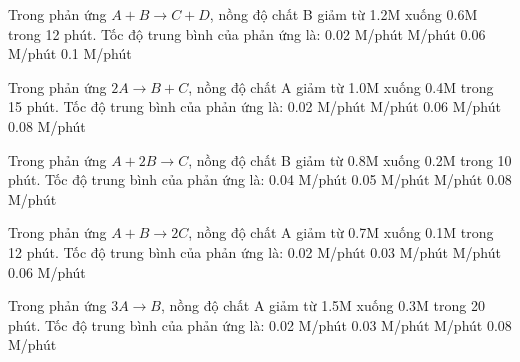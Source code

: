 \documentclass[Main.tex]{subfiles}
\begin{document}
    \begin{ex}
        Trong phản ứng $A + B \rightarrow C + D$, nồng độ chất B giảm từ 1.2M xuống 0.6M trong 12 phút. Tốc độ trung bình của phản ứng là:
        \choice
        {0.02 M/phút}
        { M/phút}
        {0.06 M/phút}
        {0.1 M/phút}
        \loigiai{
            \[
                v_{tb} = \frac{1.2 - 0.6}{12} = 0.05 \text{ M/phút}
            \]
        }
    \end{ex}
    \begin{ex}
        Trong phản ứng $2A \rightarrow B + C$, nồng độ chất A giảm từ 1.0M xuống 0.4M trong 15 phút. Tốc độ trung bình của phản ứng là:
        \choice
        {0.02 M/phút}
        { M/phút}
        {0.06 M/phút}
        {0.08 M/phút}
        \loigiai{
            \[
                v_{tb} = \frac{1.0 - 0.4}{15} = 0.04 \text{ M/phút}
            \]
        }
    \end{ex}
    \begin{ex}
        Trong phản ứng $A + 2B \rightarrow C$, nồng độ chất B giảm từ 0.8M xuống 0.2M trong 10 phút. Tốc độ trung bình của phản ứng là:
        \choice
        {0.04 M/phút}
        {0.05 M/phút}
        { M/phút}
        {0.08 M/phút}
        \loigiai{
            \[
                v_{tb} = \frac{0.8 - 0.2}{10} = 0.06 \text{ M/phút}
            \]
        }
    \end{ex}
    \begin{ex}
        Trong phản ứng $A + B \rightarrow 2C$, nồng độ chất A giảm từ 0.7M xuống 0.1M trong 12 phút. Tốc độ trung bình của phản ứng là:
        \choice
         {0.02 M/phút}
        {0.03 M/phút}
        { M/phút}
        {0.06 M/phút}
        \loigiai{
            \[
                v_{tb} = \frac{0.7 - 0.1}{12} = 0.05 \text{ M/phút}
            \]
        }
    \end{ex}
    \begin{ex}
        Trong phản ứng $3A \rightarrow B$, nồng độ chất A giảm từ 1.5M xuống 0.3M trong 20 phút. Tốc độ trung bình của phản ứng là:
        \choice
        {0.02 M/phút}
        {0.03 M/phút}
        { M/phút}
        {0.08 M/phút}
        \loigiai{
            \[
                v_{tb} = \frac{1.5 - 0.3}{20} = 0.06 \text{ M/phút}
            \]
        }
    \end{ex}
\end{document}
